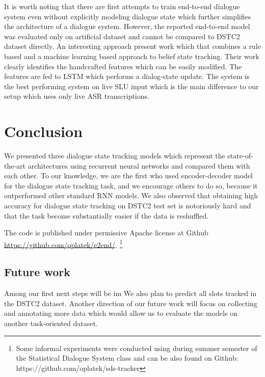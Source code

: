 \documentclass{itatnew}
\begin{document}
It is worth noting that there are first attempts to train end-to-end dialogue system even without explicitly modeling dialogue state\cite{bordes2016learning} which further simplifies the architecture of a dialogue system.
However, the reported end-to-end model was evaluated only on artificial dataset and cannot be compared to DSTC2 dataset directly.
An interesting approach present work\cite{vodolan2015hybrid} which that combines a rule based and a machine learning based approach to belief state tracking.
Their work clearly identifies the handcrafted features which can be easily modified. The features are fed to LSTM which performs a dialog-state update.
The system is the best performing system on live SLU input which is the main difference to our setup which uses only live ASR transcriptions.

\section{Conclusion}
\label{sec:conc}

We presented three dialogue state tracking models which represent the state-of-the-art architectures using recurrent neural networks and compared them with each other.
To our knowledge, we are the first who used encoder-decoder model for the dialogue state tracking task, and we encourage others to do so, because it outperformed other standard RNN models.
We also observed that obtaining high accuracy for dialogue state tracking on DSTC2 test set is notoriously hard and that the task become substantially easier if the data is reshuffled.

The code is published under permissive Apache license at Github \url{https://github.com/oplatek/e2end/}. \footnote{Some informal experiments were conducted using during summer semester of the Statistical Dialogue System class and can be also found on Github: https://github.com/oplatek/sds-tracker}
\subsection*{Future work}
Among our first next steps will be im
We also plan to predict all slots tracked in the DSTC2 dataset.
Another direction of our future work will focus on collecting and annotating more data which would allow us to evaluate the models on another task-oriented dataset.
\end{document}
